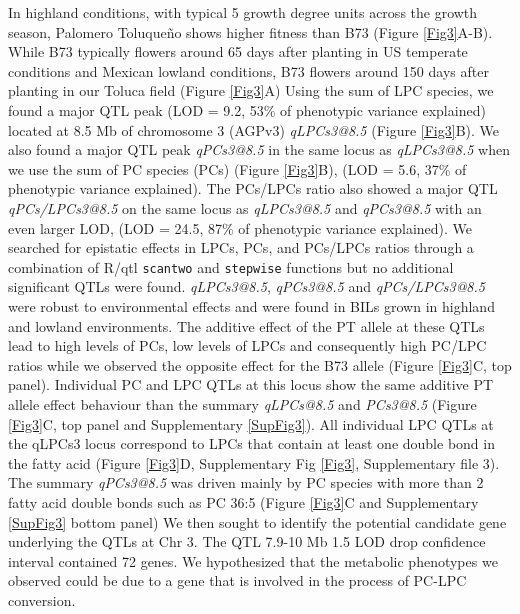 \documentclass[9pt,twocolumn,twoside,lineno]{BioRxiv}
\def\code#1{\texttt{#1}}
\begin{document}
In highland conditions, with typical 5 growth degree units across the growth season, Palomero Toluqueño shows higher fitness than B73 (Figure \ref{Fig3}A-B).
While B73 typically flowers around 65 days after planting in US temperate conditions and Mexican lowland conditions, B73 flowers around 150 days after planting in our Toluca field (Figure \ref{Fig3}A)
Using the sum of LPC species, we found a major QTL peak (LOD = 9.2, 53\% of phenotypic variance explained) located at 8.5 Mb of chromosome 3 (AGPv3)  \textit{qLPCs3@8.5} (Figure \ref{Fig3}B).
We also found a major QTL peak \textit{qPCs3@8.5} in the same locus as  \textit{qLPCs3@8.5} when we use the sum of PC species (PCs) (Figure \ref{Fig3}B), (LOD = 5.6, 37\% of phenotypic variance explained). 
The PCs/LPCs ratio also showed a major QTL \textit{qPCs/LPCs3@8.5} on the same locus as  \textit{qLPCs3@8.5} and \textit{qPCs3@8.5} with an even larger LOD, (LOD = 24.5, 87\% of phenotypic variance explained).
We searched for epistatic effects in LPCs, PCs, and PCs/LPCs ratios through a combination of R/qtl \code{scantwo} and \code{stepwise} functions \cite{broman}  but no additional significant QTLs were found.
\textit{qLPCs3@8.5}, \textit{qPCs3@8.5} and \textit{qPCs/LPCs3@8.5}  were robust to environmental effects and were found in BILs grown in highland and lowland environments.
The additive effect of the PT allele at these QTLs lead to high levels of PCs, low levels of LPCs and consequently high PC/LPC ratios while we observed the opposite effect for the B73 allele (Figure \ref{Fig3}C, top panel).
Individual PC and LPC QTLs at this locus show the same additive PT allele effect behaviour than the summary \textit{qLPCs@8.5} and \textit{PCs3@8.5} (Figure \ref{Fig3}C, top panel and Supplementary \ref{SupFig3}).
All individual LPC QTLs at the qLPCs3 locus correspond to LPCs that contain at least one double bond in the fatty acid (Figure  \ref{Fig3}D, Supplementary Fig \ref{Fig3}, Supplementary file 3).
The summary \textit{qPCs3@8.5} was driven mainly by PC species with more than 2 fatty acid double bonds such as PC 36:5 (Figure \ref{Fig3}C and Supplementary \ref{SupFig3} bottom panel)
We then sought to identify the potential candidate gene underlying the QTLs at Chr 3.
The QTL 7.9-10 Mb 1.5 LOD drop confidence interval contained 72 genes. 
We hypothesized that the metabolic phenotypes we observed could be due to a gene that is involved in the process of PC-LPC conversion.  
\end{document}

